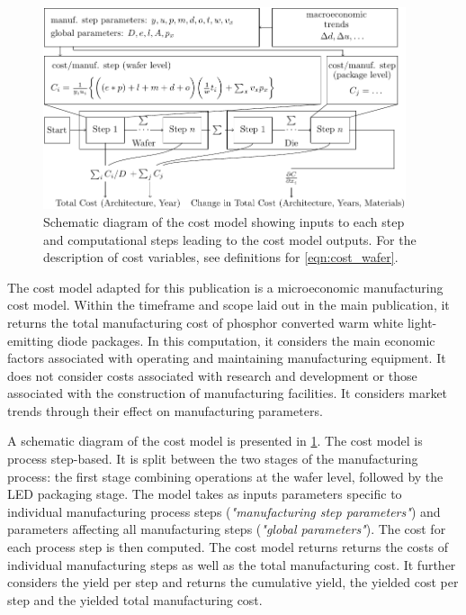 \documentclass[10pt]{article}
\begin{document}
\begin{figure}[h!]
    \centering
    \includegraphics[width=0.95\textwidth]{./figures/cost_model.pdf}
    \caption{Schematic diagram of the cost model showing inputs to each step and computational steps leading to the cost model outputs. For the description of cost variables, see definitions for \cref{eqn:cost_wafer}.}
    \label{fig:costmodel-schematic}
\end{figure}

The cost model adapted for this publication is a microeconomic manufacturing cost model. Within the timeframe and scope laid out in the main publication, it returns the total manufacturing cost of phosphor converted warm white light-emitting diode packages. In this computation, it considers the main economic factors associated with operating and maintaining manufacturing equipment. It does not consider costs associated with research and development or those associated with the construction of manufacturing facilities. It considers market trends through their effect on manufacturing parameters.

A schematic diagram of the cost model is presented in \cref{fig:costmodel-schematic}. The cost model is process step-based. It is split between the two stages of the manufacturing process: the first stage combining operations at the wafer level, followed by the LED packaging stage. The model takes as inputs parameters specific to individual manufacturing process steps (\textit{"manufacturing step parameters"}) and parameters affecting all manufacturing steps (\textit{"global parameters"}). The cost for each process step is then computed. The cost model returns returns the costs of individual manufacturing steps as well as the total manufacturing cost. It further considers the yield per step and returns the cumulative yield, the yielded cost per step and the yielded total manufacturing cost.
\end{document}
